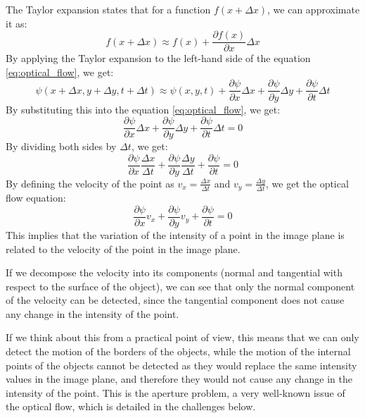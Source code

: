 The Taylor expansion states that for a function $f(x + \Delta x)$, we can approximate it as:
\begin{equation*}
    f(x + \Delta x) \approx f(x) + \frac{\partial f(x)}{\partial x} \Delta x
\end{equation*}
By applying the Taylor expansion to the left-hand side of the equation \ref{eq:optical_flow}, we get:
\begin{equation*}
    \psi(x + \Delta x, y + \Delta y, t + \Delta t) \approx \psi(x, y, t) + \frac{\partial \psi}{\partial x} \Delta x + \frac{\partial \psi}{\partial y} \Delta y + \frac{\partial \psi}{\partial t} \Delta t
\end{equation*}
By substituting this into the equation \ref{eq:optical_flow}, we get:
\begin{equation*}
    \frac{\partial \psi}{\partial x} \Delta x + \frac{\partial \psi}{\partial y} \Delta y + \frac{\partial \psi}{\partial t} \Delta t = 0
\end{equation*}
By dividing both sides by $\Delta t$, we get:
\begin{equation*}
    \frac{\partial \psi}{\partial x} \frac{\Delta x}{\Delta t} + \frac{\partial \psi}{\partial y} \frac{\Delta y}{\Delta t} + \frac{\partial \psi}{\partial t} = 0
\end{equation*}
By defining the velocity of the point as $v_x = \frac{\Delta x}{\Delta t}$ and $v_y = \frac{\Delta y}{\Delta t}$, we get the optical flow equation:
\begin{equation}
    \frac{\partial \psi}{\partial x} v_x + \frac{\partial \psi}{\partial y} v_y + \frac{\partial \psi}{\partial t} = 0
\end{equation}
This implies that the variation of the intensity of a point in the image plane is related to the velocity of the point in the image plane. 

If we decompose the velocity into its components (normal and tangential with respect to the surface of the object),
we can see that only the normal component of the velocity can be detected, since the tangential component does not cause any change in the intensity of the point.

If we think about this from a practical point of view, this means that we can only detect the motion of the borders of the objects, while the motion of the internal points 
of the objects cannot be detected as they would replace the same intensity values in the image plane, and therefore they would not cause any change in the intensity of the point.
This is the aperture problem, a very well-known issue of the optical flow, which is detailed in the challenges below.

